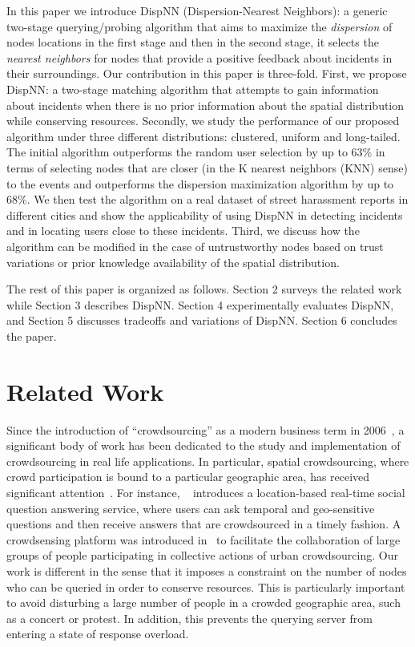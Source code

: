 \documentclass{acm_proc_article-sp}
\begin{document}
In this paper we introduce DispNN (Dispersion-Nearest Neighbors): a generic two-stage querying/probing algorithm that aims to maximize the \textit{dispersion} of nodes locations in the first stage and then in the second stage, it selects the \textit{nearest neighbors} for nodes that provide a positive feedback about incidents in their surroundings. Our contribution in this paper is three-fold. First, we propose DispNN: a two-stage matching algorithm that attempts to gain information about incidents when there is no prior information about the spatial distribution while conserving resources.  Secondly, we study the performance of our proposed algorithm under three different distributions: clustered, uniform and long-tailed. The initial algorithm outperforms the random user selection by up to $63\%$ in terms of selecting nodes that are closer (in the K nearest neighbors (KNN) sense) to the events and outperforms the dispersion maximization algorithm by up to $68\%$. We then test the algorithm on a real dataset of street harassment reports in different cities and show the applicability of using DispNN in detecting incidents and in locating users close to these incidents. Third, we discuss how the algorithm can be modified in the case of untrustworthy nodes based on trust variations or prior knowledge availability of the spatial distribution.\par
The rest of this paper is organized as follows. Section 2 surveys the related work while Section 3 describes DispNN. Section 4 experimentally evaluates DispNN, and Section 5 discusses tradeoffs and variations of DispNN. Section 6 concludes the paper.
\section{Related Work}
Since the introduction of ``crowdsourcing'' as a modern business term in 2006~\cite{howe2006rise}, a significant body of work has been dedicated to the study and implementation of crowdsourcing in real life applications. In particular, spatial crowdsourcing, where crowd participation is bound to a particular geographic area, has received significant attention~\cite{kazemi2012geocrowd, deng2013maximizing, yu2015quality}. For instance, ~\cite{liu2013using} introduces a location-based real-time social question answering service, where users can ask temporal and geo-sensitive questions and then receive answers that are crowdsourced in a timely fashion. A crowdsensing platform was introduced in~\cite{cardone2013fostering} to facilitate the collaboration of large groups of people participating in collective actions of urban crowdsourcing. Our work is different in the sense that it imposes a constraint on the number of nodes who can be queried in order to conserve resources. This is particularly important to avoid disturbing a large number of people in a crowded geographic area, such as a concert or protest. In addition, this prevents the querying server from entering a state of response overload.\par
\end{document}
